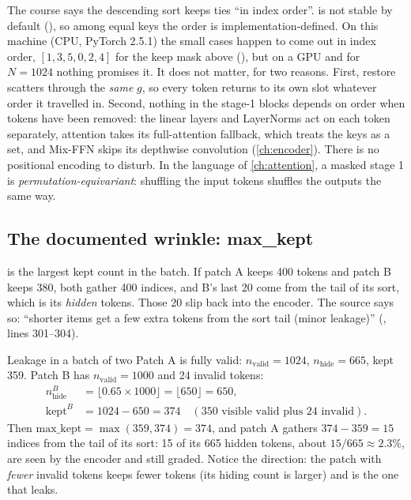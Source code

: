 \begin{sourcenote}
The course says the descending sort keeps ties ``in index order''.  is not stable by
default (), so among equal keys the order is implementation-defined. On this
machine (CPU, PyTorch 2.5.1) the small cases happen to come out in index order, $[1, 3, 5, 0, 2, 4]$
for the keep mask above (), but on a GPU and
for $N = 1024$ nothing promises it. It does not
matter, for two reasons. First, restore scatters through the \emph{same} $g$, so every token returns to
its own slot whatever order it travelled in. Second, nothing in the stage-1 blocks depends on order when
tokens have been removed: the linear layers and LayerNorms act on each token separately, attention
takes its full-attention fallback, which treats the keys as a set, and Mix-FFN skips its depthwise
convolution (\cref{ch:encoder}). There is no positional encoding to disturb. In the language of
\cref{ch:attention}, a masked stage 1 is \emph{permutation-equivariant}: shuffling the input tokens
shuffles the outputs the same way.
\end{sourcenote}

\subsection{The documented wrinkle: max\_kept}

 is the largest kept count in the batch. If patch A keeps 400 tokens and patch B keeps
380, both gather 400 indices, and B's last 20 come from the tail of its sort, which is its
\emph{hidden} tokens. Those 20 slip back into the encoder. The source says so: ``shorter items get a few
extra tokens from the sort tail (minor leakage)'' (, lines 301--304).

\begin{worked}[label={we:masking:leak}]{Leakage in a batch of two}
Patch A is fully valid: $n_{\text{valid}} = 1024$, $n_{\text{hide}} = 665$, kept 359. Patch B has
$n_{\text{valid}} = 1000$ and 24 invalid tokens:
\begin{align*}
n_{\text{hide}}^{B} &= \lfloor 0.65 \times 1000 \rfloor = \lfloor 650 \rfloor = 650,\\
\text{kept}^{B} &= 1024 - 650 = 374 \quad (\text{350 visible valid plus 24 invalid}).
\end{align*}
Then $\text{max\_kept} = \max(359, 374) = 374$, and patch A gathers $374 - 359 = 15$ indices from the
tail of its sort: 15 of its 665 hidden tokens, about $15/665 \approx 2.3\%$, are seen by the encoder
and still graded. Notice the direction: the patch with \emph{fewer} invalid tokens keeps fewer tokens
(its hiding count is larger) and is the one that leaks.
\end{worked}

